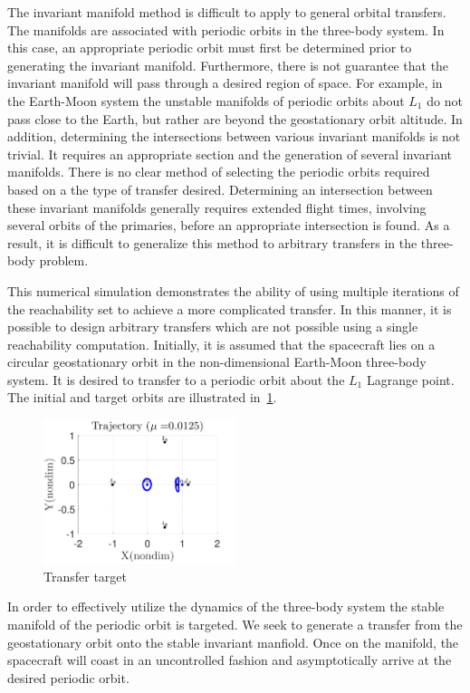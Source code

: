 \documentclass[preprint]{elsarticle}
\begin{document}
The invariant manifold method is difficult to apply to general orbital transfers. 
The manifolds are associated with periodic orbits in the three-body system. 
In this case, an appropriate periodic orbit must first be determined prior to generating the invariant manifold.
Furthermore, there is not guarantee that the invariant manifold will pass through a desired region of space. 
For example, in the Earth-Moon system the unstable manifolds of periodic orbits about \( L_1 \) do not pass close to the Earth, but rather are beyond the geostationary orbit altitude. 
In addition, determining the intersections between various invariant manifolds is not trivial. 
It requires an appropriate \Poincare section and the generation of several invariant manifolds.
There is no clear method of selecting the periodic orbits required based on a the type of transfer desired. 
Determining an intersection between these invariant manifolds generally requires extended flight times, involving several orbits of the primaries, before an appropriate intersection is found.
As a result, it is difficult to generalize this method to arbitrary transfers in the three-body problem.

This numerical simulation demonstrates the ability of using multiple iterations of the reachability set to achieve a more complicated transfer.
In this manner, it is possible to design arbitrary transfers which are not possible using a single reachability computation.
Initially, it is assumed that the spacecraft lies on a circular geostationary orbit in the non-dimensional Earth-Moon three-body system. 
It is desired to transfer to a periodic orbit about the \( L_1 \) Lagrange point. 
The initial and target orbits are illustrated in~\cref{fig:geo_transfer_target}.
\begin{figure}[htbp]
   \centering
   \includegraphics[width=0.5\textwidth]{initial_final} %
   \caption{Transfer target}
   \label{fig:geo_transfer_target}
\end{figure}
In order to effectively utilize the dynamics of the three-body system the stable manifold of the periodic orbit is targeted.
We seek to generate a transfer from the geostationary orbit onto the stable invariant manfiold.
Once on the manifold, the spacecraft will coast in an uncontrolled fashion and asymptotically arrive at the desired periodic orbit.
\end{document}
